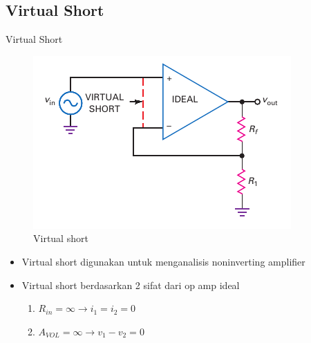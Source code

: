 \subsection{Virtual Short}
\begin{frame}{Virtual Short}
	\begin{multicols}{2}
		\begin{figure}
			\centering
			\includegraphics[width=\linewidth]{gambar/fig-16.19}
			\caption{Virtual short}
			\label{fig-16.19}
		\end{figure}
	\columnbreak
		\begin{itemize}
			\item Virtual short digunakan untuk menganalisis noninverting amplifier
			\item Virtual short berdasarkan 2 sifat dari op amp ideal
			\begin{enumerate}
				\item $ R_{in} = \infty \rightarrow i_1 = i_2 = 0$
				\item $ A_{VOL} = \infty \rightarrow v_1 - v_2 = 0$
			\end{enumerate}
		\end{itemize}
	\end{multicols}
\end{frame}

